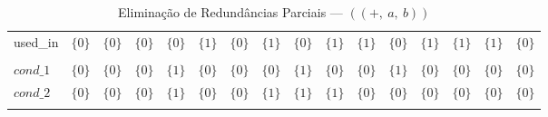 \begin{table}[ht]
\begin{tabular}{l|c|c|c|c|c|c|c|c|c|c|c|c|c|c|c}
used\_in & $\{0\}$ & $\{0\}$ & $\{0\}$ & $\{0\}$ & $\{1\}$ & $\{0\}$ & $\{1\}$ & $\{0\}$ & $\{1\}$ & $\{1\}$ & $\{0\}$ & $\{1\}$ & $\{1\}$ & $\{1\}$ & $\{0\}$ \\
 &  &  &  &  &  &  &  &  &  &  &  &  &  &  &  \\
$cond\_1$ & $\{0\}$ & $\{0\}$ & $\{0\}$ & $\{1\}$ & $\{0\}$ & $\{0\}$ & $\{0\}$ & $\{1\}$ & $\{0\}$ & $\{0\}$ & $\{1\}$ & $\{0\}$ & $\{0\}$ & $\{0\}$ & $\{0\}$ \\
$cond\_2$ & $\{0\}$ & $\{0\}$ & $\{0\}$ & $\{1\}$ & $\{0\}$ & $\{0\}$ & $\{1\}$ & $\{1\}$ & $\{1\}$ & $\{0\}$ & $\{0\}$ & $\{0\}$ & $\{0\}$ & $\{0\}$ & $\{0\}$ \\
\\
\end{tabular}
\caption{Elimina\c{c}\~ao de Redund\^ancias Parciais --- $((+,\:a,\:b))$}
\end{table}



